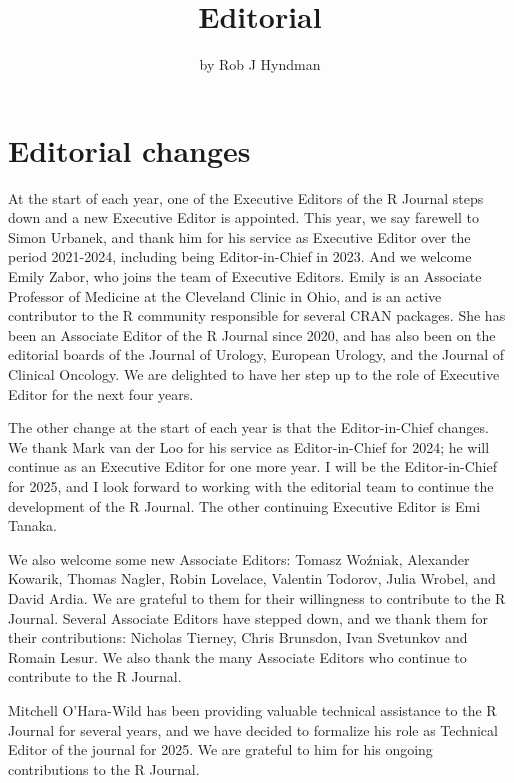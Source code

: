 \title{Editorial}


\author{by Rob J Hyndman}

\maketitle


\section*{Editorial changes}\label{editorial-changes}

At the start of each year, one of the Executive Editors of the R Journal steps down and a new Executive Editor is appointed. This year, we say farewell to Simon Urbanek, and thank him for his service as Executive Editor over the period 2021-2024, including being Editor-in-Chief in 2023. And we welcome Emily Zabor, who joins the team of Executive Editors. Emily is an Associate Professor of Medicine at the Cleveland Clinic in Ohio, and is an active contributor to the R community responsible for several CRAN packages. She has been an Associate Editor of the R Journal since 2020, and has also been on the editorial boards of the Journal of Urology, European Urology, and the Journal of Clinical Oncology. We are delighted to have her step up to the role of Executive Editor for the next four years.

The other change at the start of each year is that the Editor-in-Chief changes. We thank Mark van der Loo for his service as Editor-in-Chief for 2024; he will continue as an Executive Editor for one more year. I will be the Editor-in-Chief for 2025, and I look forward to working with the editorial team to continue the development of the R Journal. The other continuing Executive Editor is Emi Tanaka.

We also welcome some new Associate Editors: Tomasz Woźniak, Alexander Kowarik, Thomas Nagler, Robin Lovelace, Valentin Todorov, Julia Wrobel, and David Ardia. We are grateful to them for their willingness to contribute to the R Journal. Several Associate Editors have stepped down, and we thank them for their contributions: Nicholas Tierney, Chris Brunsdon, Ivan Svetunkov and Romain Lesur. We also thank the many Associate Editors who continue to contribute to the R Journal.

Mitchell O'Hara-Wild has been providing valuable technical assistance to the R Journal for several years, and we have decided to formalize his role as Technical Editor of the journal for 2025. We are grateful to him for his ongoing contributions to the R Journal.

